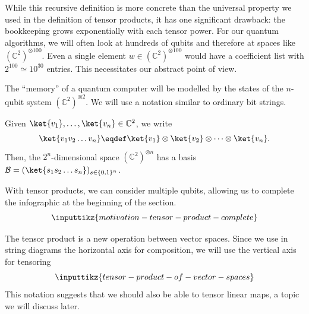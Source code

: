 \documentclass[a4paper,oneside, 12pt]{amsart}
\begin{document}
\begin{remark}
  While this recursive definition is more concrete than the universal property we used in the definition of tensor products, it has one significant drawback: the bookkeeping grows exponentially with each tensor power.
  For our quantum algorithms, we will often look at hundreds of qubits and therefore at spaces like \(( \mathbb{C}^{2})^{\otimes 100}\).
  Even a single element \(w \in ( \mathbb{C}^{2})^{\otimes 100} \) would have a coefficient list with \(2^{100} \simeq 10^{30}\) entries.
  This necessitates our abstract point of view.
\end{remark}


The ``memory'' of a quantum computer will be modelled by the states of the \( n \)-qubit system \(( \mathbb{C}^{2})^{\otimes 2}\).
We will use a notation similar to ordinary bit strings.

\begin{example}\label{ex:n-qubits}
  Given \(\ket{v_{1}}, \dots , \ket{v_{n}} \in \mathbb{C}^{2} \), we write
  \begin{equation}
    \ket{v_{1} v_{2} \dots v_{n}} \eqdef \ket{v_{1}}\otimes \ket{v_{2}} \otimes \dots \otimes \ket{v_{n}}.
  \end{equation}
  Then, the \(2^{n}\)-dimensional space \( (\mathbb{C}^{2})^{\otimes n}\)  has a basis \(\mathcal{B}= (\ket{s_{1} s_{2} \dots s_{n}})_{s\in\{0,1\}^{n}}\).
\end{example}

With tensor products, we can consider multiple qubits, allowing us to complete the infographic at the beginning of the section.
\begin{equation*}
  \inputtikz{motivation-tensor-product-complete}
\end{equation*}


\begin{remark}\label{rmk:tensor-product-string-diags}
  The tensor product is a new operation between vector spaces.
  Since we use in string diagrams the horizontal axis for composition, we will use the vertical axis for tensoring
  \begin{equation*}
    \inputtikz{tensor-product-of-vector-spaces}
  \end{equation*}
  This notation suggests that we should also be able to tensor linear maps, a topic we will discuss later.
\end{remark}
\end{document}
